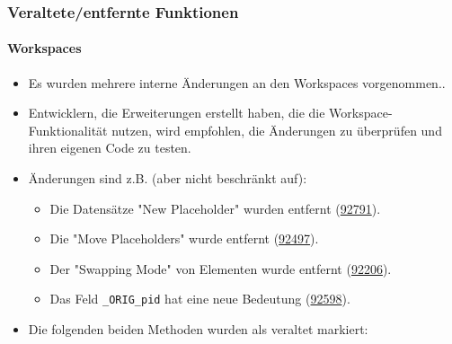 %

\begin{frame}[fragile]
	\frametitle{Veraltete/entfernte Funktionen}
	\framesubtitle{Workspaces}

	\begin{itemize}
		\item Es wurden mehrere interne Änderungen an den Workspaces vorgenommen..
		\item Entwicklern, die Erweiterungen erstellt haben, die die Workspace-Funktionalität nutzen,
			wird empfohlen, die Änderungen zu überprüfen und ihren eigenen Code zu testen.
		\item Änderungen sind z.B. (aber nicht beschränkt auf):

			\begin{itemize}\small
				\item Die Datensätze "New Placeholder" wurden entfernt
					(\href{https://docs.typo3.org/c/typo3/cms-core/master/en-us/Changelog/11.0/Breaking-92791-NewPlaceholderRecordsRemovedInWorkspaces.html}{92791}).
				\item Die "Move Placeholders" wurde entfernt
					(\href{https://docs.typo3.org/c/typo3/cms-core/master/en-us/Changelog/11.0/Breaking-92497-WorkspacesMovePlaceholdersRemoved.html}{92497}).
				\item Der "Swapping Mode" von Elementen wurde entfernt
					(\href{https://docs.typo3.org/c/typo3/cms-core/master/en-us/Changelog/11.0/Breaking-92206-RemoveWorkspaceSwappingOfElements.html}{92206}).
				\item Das Feld \texttt{\_ORIG\_pid} hat eine neue Bedeutung
					(\href{https://docs.typo3.org/c/typo3/cms-core/master/en-us/Changelog/11.0/Breaking-92598-Workspace-overlaysAuto-fixThePIDValueForMovedRecords.html}{92598}).
			\end{itemize}

		\item Die folgenden beiden Methoden wurden als veraltet markiert:


\end{itemize}
\end{frame}
